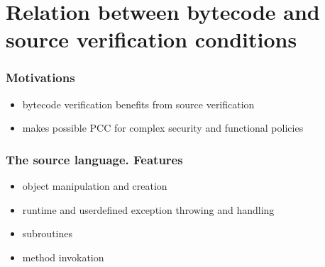 \documentclass{beamer}
\begin{document}
%                       

 \section{Relation between bytecode and source verification conditions}


   \begin{frame}\frametitle{Motivations}
       \begin{itemize}
	  \item bytecode verification benefits from source verification 
          \item makes possible PCC for complex security and functional policies 
       \end{itemize}
   \end{frame}

   \begin{frame}\frametitle{The source language. Features}
       \begin{itemize}
	      \item  object manipulation and creation 
	   
              \item  runtime and userdefined exception throwing and handling
		
	       \item subroutines	
	    	
	      \item  method invokation
       \end{itemize}
   \end{frame}
   
\end{document}
